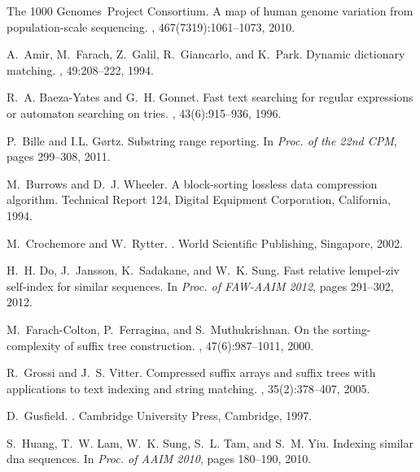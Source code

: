 \documentclass{llncs}
\begin{document}
{\begin{thebibliography}{10}

The 1000 Genomes~Project Consortium.
\newblock A map of human genome variation from population-scale sequencing.
, 467(7319):1061--1073, 2010.

A.~Amir, M.~Farach, Z.~Galil, R.~Giancarlo, and K.~Park.
\newblock Dynamic dictionary matching.
, 49:208--222, 1994.

R.~A. Baeza-Yates and G.~H. Gonnet.
\newblock Fast text searching for regular expressions or automaton searching on
  tries.
, 43(6):915--936, 1996.

P.~Bille and I.L. G{\o}rtz.
\newblock Substring range reporting.
\newblock In {\em Proc. of the 22nd CPM}, pages 299--308, 2011.

M.~Burrows and D.~J. Wheeler.
\newblock A block-sorting lossless data compression algorithm.
\newblock Technical Report 124, Digital Equipment Corporation,
  California, 1994.

M.~Crochemore and W.~Rytter.
.
\newblock World Scientific Publishing, Singapore, 2002.

H.~H. Do, J.~Jansson, K.~Sadakane, and W.~K. Sung.
\newblock Fast relative lempel-ziv self-index for similar sequences.
\newblock In {\em Proc. of FAW-AAIM 2012}, pages 291--302, 2012.

M.~Farach-Colton, P.~Ferragina, and S.~Muthukrishnan.
\newblock On the sorting-complexity of suffix tree construction.
, 47(6):987--1011, 2000.

R.~Grossi and J.~S. Vitter.
\newblock Compressed suffix arrays and suffix trees with applications to text
  indexing and string matching.
, 35(2):378--407, 2005.

D.~Gusfield.
.
\newblock Cambridge University Press, Cambridge, 1997.

S.~Huang, T.~W. Lam, W.~K. Sung, S.~L. Tam, and S.~M. Yiu.
\newblock Indexing similar dna sequences.
\newblock In {\em Proc. of AAIM 2010}, pages 180--190, 2010.


\end{thebibliography}}
\end{document}
